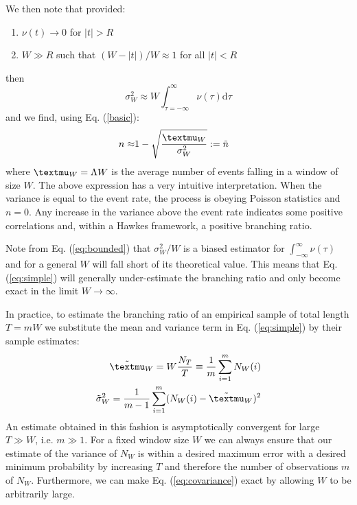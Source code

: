 \documentclass{article}
\newcommand{\assign}{:=}
\begin{document}
We then note that provided:
\begin{enumerate}
  \item $\nu (t) \to 0$ for $|t| > R$
  
  \item $W \gg R$ such that $(W - |t|) / W \approx 1$ for all $|t| < R$
\end{enumerate}
then
\begin{equation}
  \sigma^2_W \approx W \int_{\tau = - \infty}^{\infty} \nu (\tau) \mathrm{d}
  \tau \label{eq:covariance}
\end{equation}
and we find, using Eq. (\ref{basic}):
\begin{eqnarray}
  n \approx & 1 - \sqrt{\frac{{\textmu}_W}{\sigma^2_W}} \assign \tilde{n} 
  \label{eq:simple}
\end{eqnarray}
where ${\textmu}_W = \Lambda W$ is the average number of events falling in a
window of size $W$. The above expression has a very intuitive interpretation.
When the variance is equal to the event rate, the process is obeying Poisson
statistics and $n = 0$. Any increase in the variance above the event rate
indicates some positive correlations and, within a Hawkes framework, a
positive branching ratio.

Note from Eq. (\ref{eq:bounded}) that $\sigma^2_W / W$ is a biased estimator
for $\int_{- \infty}^{\infty} \nu (\tau)$ and for a general $W$ will fall
short of its theoretical value. This means that Eq. (\ref{eq:simple}) will
generally under-estimate the branching ratio and only become exact in the
limit $W \to \infty$.

In practice, to estimate the branching ratio of an empirical sample of total
length $T = mW$ we substitute the mean and variance term in Eq.
(\ref{eq:simple}) by their sample estimates:
\begin{eqnarray}
  \tilde{{\textmu}}_W = W \frac{N_T}{T} \equiv \frac{1}{m}  \sum_{i = 1}^m N_W
  (i) \\
  \tilde{\sigma}^2_W = \frac{1}{m - 1}  \sum_{i = 1}^m (N_W (i) -
  \tilde{{\textmu}}_W)^2  \label{eq:variance}
\end{eqnarray}
An estimate obtained in this fashion is asymptotically convergent for large $T
\gg W$, i.e. $m \gg 1$. For a fixed window size $W$ we can always ensure that
our estimate of the variance of $N_W$ is within a desired maximum error with a
desired minimum probability by increasing $T$ and therefore the number of
observations $m$ of $N_W$. Furthermore, we can make Eq. (\ref{eq:covariance})
exact by allowing $W$ to be arbitrarily large.
\end{document}
